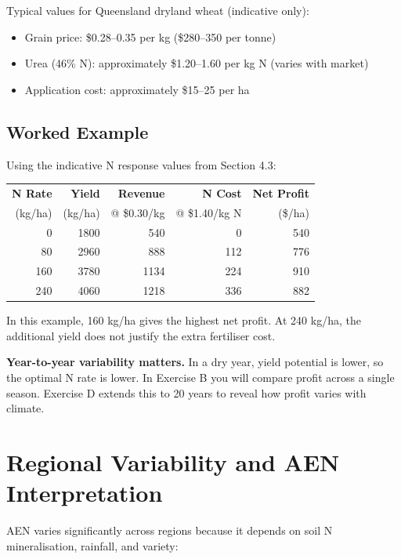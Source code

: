 Typical values for Queensland dryland wheat (indicative only):
\begin{itemize}
  \item Grain price: \$0.28--0.35 per kg (\$280--350 per tonne)
  \item Urea (46\% N): approximately \$1.20--1.60 per kg N (varies with market)
  \item Application cost: approximately \$15--25 per ha
\end{itemize}

\subsection{Worked Example}

Using the indicative N response values from Section 4.3:

\begin{center}
\begin{tabular}{r|r|r|r|r}
\textbf{N Rate} & \textbf{Yield} & \textbf{Revenue} & \textbf{N Cost} & \textbf{Net Profit} \\
(kg/ha) & (kg/ha) & @ \$0.30/kg & @ \$1.40/kg N & (\$/ha) \\
\hline
0   & 1800 & 540  & 0   & 540 \\
80  & 2960 & 888  & 112 & 776 \\
160 & 3780 & 1134 & 224 & 910 \\
240 & 4060 & 1218 & 336 & 882 \\
\end{tabular}
\end{center}

In this example, 160 kg/ha gives the highest net profit. At 240 kg/ha, the additional yield does not justify the extra fertiliser cost.

\begin{warningbox}
\textbf{Year-to-year variability matters.} In a dry year, yield potential is lower, so the optimal N rate is lower. In Exercise B you will compare profit across a single season. Exercise D extends this to 20 years to reveal how profit varies with climate.
\end{warningbox}

\section{Regional Variability and AEN Interpretation}

AEN varies significantly across regions because it depends on soil N mineralisation, rainfall, and variety:

